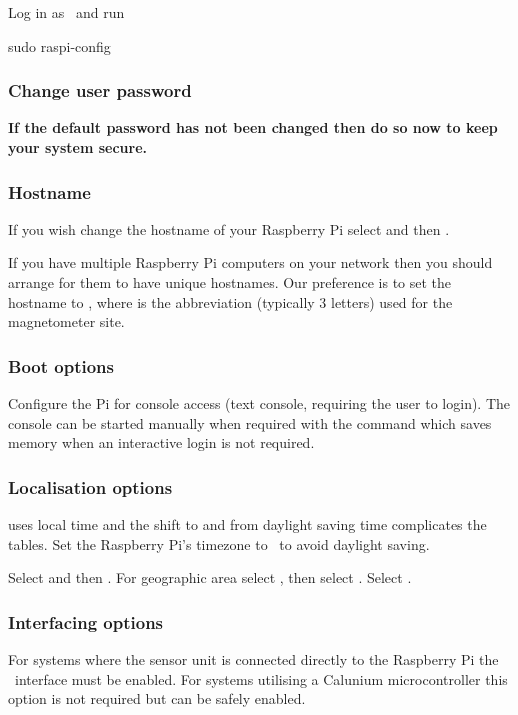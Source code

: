 Log in as \piUser\ and run
\begin{Cmd}
sudo raspi-config
\end{Cmd}

\subsubsection{Change user password}
\textbf{If the default password has not been changed then do so now to keep
your system secure.}

\subsubsection{Hostname} 
If you wish change the hostname of your Raspberry Pi select
 and then .

If you have multiple Raspberry Pi computers on your network then you
should arrange for them to have unique hostnames. Our preference is to
set the hostname to , where  is the
abbreviation (typically 3 letters) used for the magnetometer site.

\subsubsection{Boot options} 
Configure the Pi for console access (text console, requiring the user
to login). The console can be started manually when required with the
 command which saves memory when an interactive login
is not required.

\subsubsection{Localisation options}
 uses local time and the shift to and from daylight
saving time complicates the  tables. Set the Raspberry
Pi's timezone to \utc\ to avoid daylight saving.

Select  and
then . For geographic area select %
, then select \code{\utc}. Select .

\subsubsection{Interfacing options}
For systems where the sensor unit is connected directly to the
Raspberry Pi the \itwoc\ interface must be enabled. For systems
utilising a Calunium microcontroller this option is not required but
can be safely enabled.

